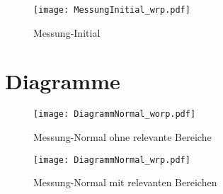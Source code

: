 \newpage

\begin{figure}[H]
	\texttt{[image: MessungInitial\_wrp.pdf]}
	\caption{Messung-Initial}	
\end{figure}

\section{Diagramme}
\label{sec:Diagramme}

\newpage

\begin{figure}[H]
	\centering
	\texttt{[image: DiagrammNormal\_worp.pdf]}
	\label{fig:diagrammNormal_worp}
	\caption{Messung-Normal ohne relevante Bereiche}
\end{figure}

\newpage

\begin{figure}[H]
	\centering
	\texttt{[image: DiagrammNormal\_wrp.pdf]}
	\label{fig:diagrammNormal_wrp}
	\caption{Messung-Normal mit relevanten Bereichen}
\end{figure}
